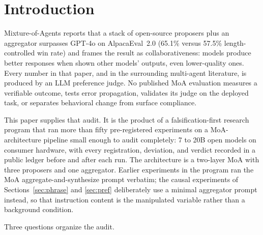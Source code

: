 \documentclass[11pt]{article}
\begin{document}
\begin{abstract}
and prospectively re-tested as their own registered experiments.
Assigning a contested quantity to a second proposer halves
corrupted-value adoption (from $0.90$ to $0.45$); carrying epistemic
qualification out-of-band, in a mechanically assembled appendix the
writer never sees, preserves all of it against the $17\%$ that
survives prose, measurably changes downstream decisions ($+0.69$ over
a matched irrelevant-appendix control, at parity with in-prose
placement), and shows no detected preference cost; and the
re-consultation loop closes end-to-end with a live proposer (adoption
$0.905$ versus $0.333$, within noise of a scripted ceiling). The
measurement kit, the dictation registry, and all pre-registrations are
released.
\end{abstract}

\section{Introduction}
\label{sec:intro}

Mixture-of-Agents \cite{wang2024moa} reports that a stack of
open-source proposers plus an aggregator surpasses GPT-4o on
AlpacaEval~2.0 (65.1\% versus 57.5\% length-controlled win rate) and
frames the result as collaborativeness: models produce better responses
when shown other models' outputs, even lower-quality ones. Every number
in that paper, and in the surrounding multi-agent literature, is
produced by an LLM preference judge. No published MoA evaluation
measures a verifiable outcome, tests error propagation, validates its
judge on the deployed task, or separates behavioral change from surface
compliance.

This paper supplies that audit. It is the product of a
falsification-first research program that ran more than fifty
pre-registered experiments on a MoA-architecture pipeline small enough
to audit completely: 7 to 20B open models on consumer hardware, with
every registration, deviation, and verdict recorded in a public ledger
before and after each run. The architecture is a two-layer MoA with
three proposers and one aggregator. Earlier experiments in the program
ran the MoA aggregate-and-synthesize prompt verbatim; the causal
experiments of Sections~\ref{sec:phrase} and \ref{sec:pref}
deliberately use a minimal aggregator prompt instead, so that
instruction content is the manipulated variable rather than a
background condition.

Three questions organize the audit.
\end{document}
